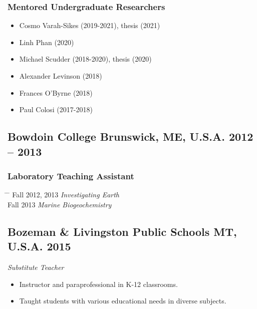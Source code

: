 \subsubsection*{Mentored Undergraduate Researchers}
\begin{itemize}
	\item Cosmo Varah-Sikes (2019-2021), thesis (2021)
	\item Linh Phan (2020)
	\item Michael Scudder (2018-2020), thesis (2020)
	\item Alexander Levinson (2018)
	\item Frances O'Byrne (2018)
	\item Paul Colosi (2017-2018)
\end{itemize}

\subsection*{\textbf{Bowdoin College} \hspace{15pt} Brunswick, ME, U.S.A. \hfill 2012 – 2013}
\subsubsection*{Laboratory Teaching Assistant}
\begin{tabbing} \hspace{10pt} \= \hspace{2.5cm} \=  \kill
\> Fall 2012, 2013 \> \textit{Investigating Earth}\\
\> Fall 2013 \> \textit{Marine Biogeochemistry}
\end{tabbing}

\subsection*{\textbf{Bozeman \& Livingston Public Schools} \hspace{15pt} MT, U.S.A. \hfill 2015}
\textit{Substitute Teacher}
\begin{itemize}
	\item Instructor and paraprofessional in K-12 classrooms.
	\item Taught students with various educational needs in diverse subjects.
\end{itemize}